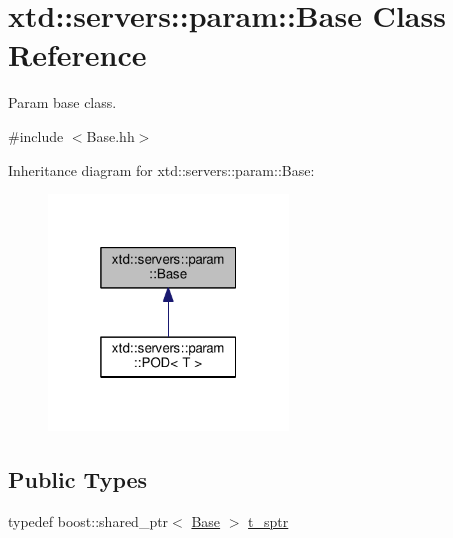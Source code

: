 \hypertarget{classxtd_1_1servers_1_1param_1_1Base}{}\section{xtd\+:\+:servers\+:\+:param\+:\+:Base Class Reference}
\label{classxtd_1_1servers_1_1param_1_1Base}


Param base class.  




{\ttfamily \#include $<$Base.\+hh$>$}



Inheritance diagram for xtd\+:\+:servers\+:\+:param\+:\+:Base\+:
\nopagebreak
\begin{figure}[H]
\begin{center}
\leavevmode
\includegraphics[width=181pt]{classxtd_1_1servers_1_1param_1_1Base__inherit__graph}
\end{center}
\end{figure}
\subsection*{Public Types}
\begin{DoxyCompactItemize}
\item 
typedef boost\+::shared\+\_\+ptr$<$ \hyperlink{classxtd_1_1servers_1_1param_1_1Base}{Base} $>$ \hyperlink{classxtd_1_1servers_1_1param_1_1Base_aaf4d92eca642f61cb81524096926c6a1}{t\+\_\+sptr}
\end{DoxyCompactItemize}
